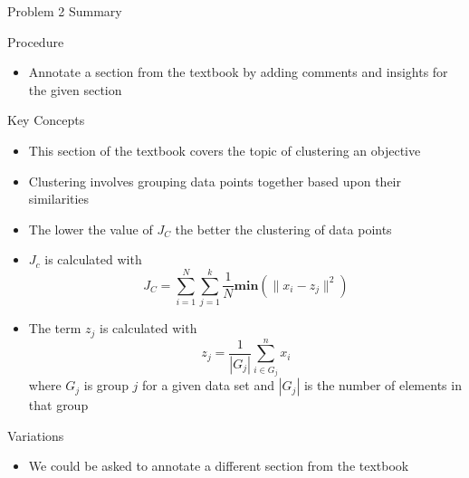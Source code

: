 \begin{summary}{Problem 2 Summary}
    \begin{statement}{Procedure}
        \begin{itemize}
            \item Annotate a section from the textbook by adding comments and insights for the given section
        \end{itemize}
    \end{statement}
    \begin{statement}{Key Concepts}
        \begin{itemize}
            \item This section of the textbook covers the topic of clustering an objective
            \item Clustering involves grouping data points together based upon their similarities
            \item The lower the value of $J_{C}$ the better the clustering of data points
            \item $J_{c}$ is calculated with 
            \begin{equation*}
                J_{C} = \sum_{i = 1}^{N}\sum_{j = 1}^{k} \frac{1}{N} \mathbf{min}(\|x_{i} - z_{j}\|^{2})
            \end{equation*}
            \item The term $z_{j}$ is calculated with
            \begin{equation*}
                z_{j} = \frac{1}{|G_{j}|} \sum_{i \in G_{j}}^{n} x_{i}
            \end{equation*}
            where $G_{j}$ is group $j$ for a given data set and $|G_{j}|$ is the number of elements in that group
        \end{itemize}
    \end{statement}
    \begin{statement}{Variations}
        \begin{itemize}
            \item We could be asked to annotate a different section from the textbook
        \end{itemize}
    \end{statement}
\end{summary}

